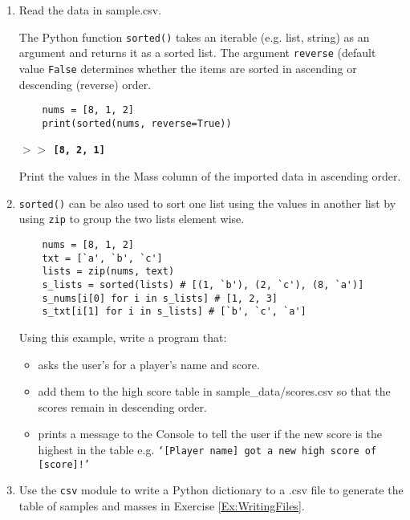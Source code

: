 \documentclass[11pt]{report}
\begin{document}
\begin{enumerate}[label=(\Alph*)]
    
    \item Read the data in sample.csv. 
    
    The Python function {\tt sorted()} takes an iterable (e.g. list, string) as an argument and returns it as a sorted list. The argument {\tt reverse} (default value {\tt False} determines whether the items are sorted in ascending or descending (reverse) order. 
    \vspace{0.5 em}
    \begin{verbatim}
    nums = [8, 1, 2]
    print(sorted(nums, reverse=True))
    \end{verbatim}
    {\bf $>$$>$ {\tt [8, 2, 1]}}
    
    Print the values in the Mass column of the imported data in  ascending order. 
    
    \item {\tt sorted()} can be also used to sort one list using the values in another list by using {\tt zip} to group the two lists element wise.
    \vspace{0.5 em}
    \begin{verbatim}
    nums = [8, 1, 2]
    txt = [`a', `b', `c']
    lists = zip(nums, text) 
    s_lists = sorted(lists) # [(1, `b'), (2, `c'), (8, `a')]
    s_nums[i[0] for i in s_lists] # [1, 2, 3]
    s_txt[i[1] for i in s_lists] # [`b', `c', `a']
    \end{verbatim}

    Using this example, write a program that:
    \begin{itemize}
        \item asks the user's for a player's name and score.
        \item add them to the high score table in sample\_data/scores.csv so that the scores remain in descending order.
        \item prints a message to the Console to tell the user if the new score is the highest in the table e.g. {\tt `[Player name] got a new high score of [score]!'} 
    \end{itemize} 
    
    \item Use the {\tt csv} module to write a Python dictionary to a .csv file to generate the table of samples and masses in Exercise \ref{Ex:WritingFiles}.  
    
\end{enumerate}
\end{document}
